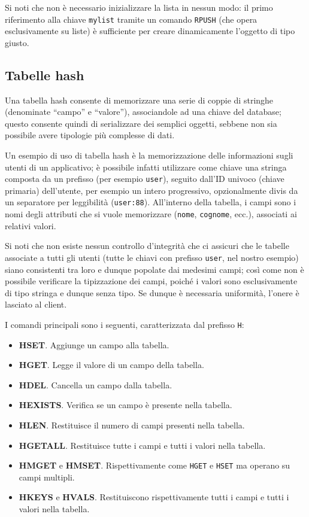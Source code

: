 Si noti che non è necessario inizializzare la lista in nessun modo: il primo riferimento alla chiave
\verb|mylist| tramite un comando \verb|RPUSH| (che opera esclusivamente su liste) è sufficiente
per creare dinamicamente l'oggetto di tipo giusto.

\subsection{Tabelle hash}

Una tabella hash consente di memorizzare una serie di coppie di stringhe (denominate ``campo'' e
``valore''), associandole ad una chiave del database; questo consente quindi di serializzare dei
semplici oggetti, sebbene non sia possibile avere tipologie più complesse di dati.

Un esempio di uso di tabella hash è la memorizzazione delle informazioni sugli utenti di un
applicativo; è possibile infatti utilizzare come chiave una stringa composta da un prefisso (per
esempio \verb|user|), seguito dall'ID univoco (chiave primaria) dell'utente, per esempio un intero
progressivo, opzionalmente divis da un separatore per leggibilità (\verb|user:88|). All'interno
della tabella, i campi sono i nomi degli attributi che si vuole memorizzare (\verb|nome|,
\verb|cognome|, ecc.), associati ai relativi valori.

Si noti che non esiste nessun controllo d'integrità che ci assicuri che le tabelle associate a tutti
gli utenti (tutte le chiavi con prefisso \verb|user|, nel nostro esempio) siano consistenti tra loro
e dunque popolate dai medesimi campi; così come non è possibile verificare la tipizzazione dei
campi, poiché i valori sono esclusivamente di tipo stringa e dunque senza tipo. Se dunque è
necessaria uniformità, l'onere è lasciato al client.

I comandi principali sono i seguenti, caratterizzata dal prefisso \verb|H|:

\begin{itemize}
	\medskip
	\item \textbf{HSET}. Aggiunge un campo alla tabella.
	\item \textbf{HGET}. Legge il valore di un campo della tabella.
	\item \textbf{HDEL}. Cancella un campo dalla tabella.
	\item \textbf{HEXISTS}. Verifica se un campo è presente nella tabella.
	\item \textbf{HLEN}. Restituisce il numero di campi presenti nella tabella.
	\item \textbf{HGETALL}. Restituisce tutte i campi e tutti i valori nella tabella.
	\item \textbf{HMGET} e \textbf{HMSET}. Rispettivamente come \verb|HGET| e \verb|HSET| ma operano
	su campi multipli.
	\item \textbf{HKEYS} e \textbf{HVALS}. Restituiscono rispettivamente tutti i campi e tutti i
	valori nella tabella.
\end{itemize}

